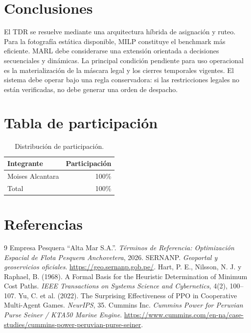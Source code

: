 \section{Conclusiones}
El TDR se resuelve mediante una arquitectura híbrida de asignación y ruteo. Para la fotografía estática disponible, MILP constituye el benchmark más eficiente. MARL debe considerarse una extensión orientada a decisiones secuenciales y dinámicas.
La principal condición pendiente para uso operacional es la materialización de la máscara legal y los cierres temporales vigentes. El sistema debe operar bajo una regla conservadora: si las restricciones legales no están verificadas, no debe generar una orden de despacho.
\section{Tabla de participación}
\begin{table}[H]
\centering
\caption{Distribución de participación.}
\begin{tabular}{lr}
\toprule
Integrante & Participación \\
\midrule
Moises Alcantara & 100\% \\
\midrule
Total & 100\% \\
\bottomrule
\end{tabular}
\end{table}
\newpage
\section*{Referencias}
\begin{thebibliography}{9}
 Empresa Pesquera ``Alta Mar S.A.''. \textit{Términos de Referencia: Optimización Espacial de Flota Pesquera Anchovetera}, 2026.
 SERNANP. \textit{Geoportal y geoservicios oficiales}. \url{https://geo.sernanp.gob.pe/}.
 Hart, P. E., Nilsson, N. J. y Raphael, B. (1968). A Formal Basis for the Heuristic Determination of Minimum Cost Paths. \textit{IEEE Transactions on Systems Science and Cybernetics}, 4(2), 100--107.
 Yu, C. et al. (2022). The Surprising Effectiveness of PPO in Cooperative Multi-Agent Games. \textit{NeurIPS}, 35.
 Cummins Inc. \textit{Cummins Power for Peruvian Purse Seiner / KTA50 Marine Engine}. \url{https://www.cummins.com/en-na/case-studies/cummins-power-peruvian-purse-seiner}.
\end{thebibliography}
\appendix
